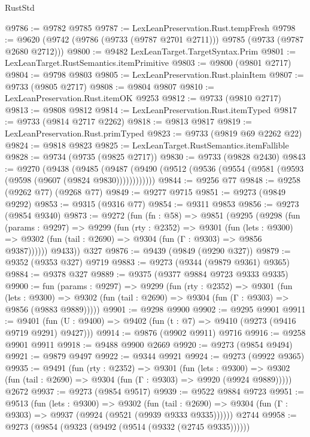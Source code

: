 \begin{lexlean}{RustStd}
\begin{coremodule}
{\begin{coremodule}
{{{{{{{{{{{{{{{{{{{{{{{{{{{{{{{{{{{{{{{{{{{{{{{{{{{{{{{@9786 := @9782 @9785
@9787 := LexLeanPreservation.Rust.tempFresh
@9798 := @9620 (@9742 (@9786 (@9733 (@9787 @2701 @2711))) @9785 (@9733 (@9787 @2680 @2712)))
@9800 := @9482 LexLeanTarget.TargetSyntax.Prim
@9801 := LexLeanTarget.RustSemantics.itemPrimitive
@9803 := @9800 (@9801 @2717)
@9804 := @9798 @9803
@9805 := LexLeanPreservation.Rust.plainItem
@9807 := @9733 (@9805 @2717)
@9808 := @9804 @9807
@9810 := LexLeanPreservation.Rust.itemOK @9253
@9812 := @9733 (@9810 @2717)
@9813 := @9808 @9812
@9814 := LexLeanPreservation.Rust.itemTyped
@9817 := @9733 (@9814 @2717 @2262)
@9818 := @9813 @9817
@9819 := LexLeanPreservation.Rust.primTyped
@9823 := @9733 (@9819 @69 @2262 @22)
@9824 := @9818 @9823
@9825 := LexLeanTarget.RustSemantics.itemFallible
@9828 := @9734 (@9735 (@9825 @2717))
@9830 := @9733 (@9828 @2430)
@9843 := @9270
    (@9438
      (@9485 (@9487 (@9490 (@9512 (@9536 (@9554 (@9581 (@9593 (@9598 (@9607 (@9824 @9830))))))))))))
@9844 := @9256 @77
@9848 := @9258 (@9262 @77) (@9268 @77)
@9849 := @9277 @9715
@9851 := @9273 (@9849 @9292)
@9853 := @9315 (@9316 @77)
@9854 := @9311 @9853
@9856 := @9273 (@9854 @9340)
@9873 := @9272
    (fun (fn : @58) =>
    @9851
      (@9295
        (@9298
          (fun (params : @9297) =>
          @9299
            (fun (rty : @2352) =>
            @9301
              (fun (lets : @9300) =>
              @9302 (fun (tail : @2690) => @9304 (fun (Γ : @9303) => @9856 @9387))))))
        @9433))
    @327
@9876 := @9439 (@9849 (@9290 @327))
@9879 := @9352 (@9353 @327) @9719
@9883 := @9273 (@9344 (@9879 @9361) @9365)
@9884 := @9378 @327
@9889 := @9375 (@9377 @9884 @9723 @9333 @9335)
@9900 := fun (params : @9297) =>
  @9299
    (fun (rty : @2352) =>
    @9301
      (fun (lets : @9300) =>
      @9302 (fun (tail : @2690) => @9304 (fun (Γ : @9303) => @9856 (@9883 @9889)))))
@9901 := @9298 @9900
@9902 := @9295 @9901
@9911 := @9401 (fun (U : @9400) => @9402 (fun (t : @7) => @9410 (@9273 (@9416 @9719 @9291) @9427)))
@9914 := @9876 (@9902 @9911) @9716
@9916 := @9258 @9901 @9911
@9918 := @9488 @9900 @2669
@9920 := @9273 (@9854 @9494)
@9921 := @9879 @9497
@9922 := @9344 @9921
@9924 := @9273 (@9922 @9365)
@9935 := @9491
    (fun (rty : @2352) =>
    @9301
      (fun (lets : @9300) =>
      @9302 (fun (tail : @2690) => @9304 (fun (Γ : @9303) => @9920 (@9924 @9889)))))
    @2672
@9937 := @9273 (@9854 @9517)
@9939 := @9522 @9884 @9723
@9951 := @9513
    (fun (lets : @9300) =>
    @9302
      (fun (tail : @2690) => @9304 (fun (Γ : @9303) => @9937 (@9924 (@9521 (@9939 @9333 @9335))))))
    @2744
@9958 := @9273 (@9854 (@9323 (@9492 (@9514 (@9332 (@2745 @9335))))))
}}}}}}}}}}}}}}}}}}}}}}}}}}}}}}}}}}}}}}}}}}}}}}}}}}}}}}}
\end{coremodule}}
\end{coremodule}
\end{lexlean}
